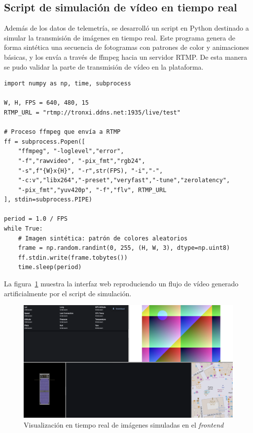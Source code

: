 \subsection*{Script de simulación de vídeo en tiempo real}

Además de los datos de telemetría, se desarrolló un script en Python destinado a simular la transmisión de imágenes en tiempo real. Este programa genera de forma sintética una secuencia de fotogramas con patrones de color y animaciones básicas, y los envía a través de ffmpeg hacia un servidor RTMP. De esta manera se pudo
validar la parte de transmisión de vídeo en la plataforma.

\begin{verbatim}
import numpy as np, time, subprocess

W, H, FPS = 640, 480, 15
RTMP_URL = "rtmp://tronxi.ddns.net:1935/live/test"

# Proceso ffmpeg que envía a RTMP
ff = subprocess.Popen([
    "ffmpeg", "-loglevel","error",
    "-f","rawvideo", "-pix_fmt","rgb24",
    "-s",f"{W}x{H}", "-r",str(FPS), "-i","-",
    "-c:v","libx264","-preset","veryfast","-tune","zerolatency",
    "-pix_fmt","yuv420p", "-f","flv", RTMP_URL
], stdin=subprocess.PIPE)

period = 1.0 / FPS
while True:
    # Imagen sintética: patrón de colores aleatorios
    frame = np.random.randint(0, 255, (H, W, 3), dtype=np.uint8)
    ff.stdin.write(frame.tobytes())
    time.sleep(period)

\end{verbatim}
La figura~\ref{fig:simulacion-camera} muestra la interfaz web reproduciendo un flujo de vídeo generado artificialmente por el script de simulación.
\begin{figure}[H]
    \centering
    \includegraphics[width=1\textwidth]{Imagenes/Bitmap/simulacion_camera}
    \caption{Visualización en tiempo real de imágenes simuladas en el \emph{frontend}}
    \label{fig:simulacion-camera}
\end{figure}

